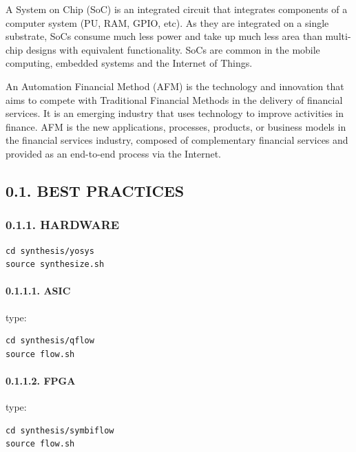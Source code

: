 \documentclass[
]{article}
\begin{document}
A System on Chip (SoC) is an integrated circuit that integrates
components of a computer system (PU, RAM, GPIO, etc). As they are
integrated on a single substrate, SoCs consume much less power and take
up much less area than multi-chip designs with equivalent functionality.
SoCs are common in the mobile computing, embedded systems and the
Internet of Things.

An Automation Financial Method (AFM) is the technology and innovation
that aims to compete with Traditional Financial Methods in the delivery
of financial services. It is an emerging industry that uses technology
to improve activities in finance. AFM is the new applications,
processes, products, or business models in the financial services
industry, composed of complementary financial services and provided as
an end-to-end process via the Internet.

\hypertarget{best-practices-1}{%
\subsection{0.1. BEST PRACTICES}\label{best-practices-1}}

\hypertarget{hardware-1}{%
\subsubsection{0.1.1. HARDWARE}\label{hardware-1}}

\begin{verbatim}
cd synthesis/yosys
source synthesize.sh
\end{verbatim}

\hypertarget{asic-1}{%
\paragraph{0.1.1.1. ASIC}\label{asic-1}}

type:

\begin{verbatim}
cd synthesis/qflow
source flow.sh
\end{verbatim}

\hypertarget{fpga-1}{%
\paragraph{0.1.1.2. FPGA}\label{fpga-1}}

type:

\begin{verbatim}
cd synthesis/symbiflow
source flow.sh
\end{verbatim}
\end{document}
